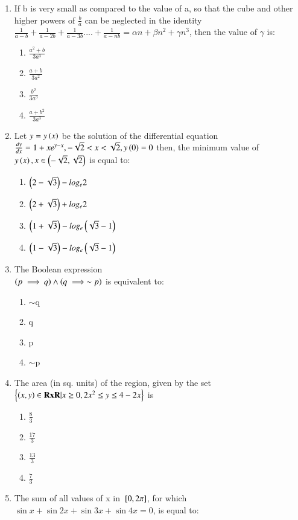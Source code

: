 \documentclass[journal,12pt,onecolumn]{IEEEtran}
\theoremstyle{remark}
\begin{document}
\begin{enumerate}
\begin{enumerate}
\end{enumerate}
\item If b is very small as compared to the value of a, so that the cube and other higher powers of $\frac{b}{a}$ can be neglected in the identity\\
$\frac{1}{a-b}+\frac{1}{a-2b}+\frac{1}{a-3b}....+\frac{1}{a-nb}=\alpha n+\beta n^2+\gamma n^3$, then the value of $\gamma$ is:
\begin{enumerate}
    \item $\frac{a^2+b}{3a^3}$
    \item $\frac{a+b}{3a^2}$
    \item $\frac{b^2}{3a^3}$
    \item $\frac{a+b^2}{3a^3}$
\end{enumerate}
\item Let $y=y\left(x\right)$ be the solution of the differential equation $\frac{dy}{dx}=1+xe^{y-x}, -\sqrt{2}<x<\sqrt{2},y\left(0\right)=0$ then, the minimum value of $y\left(x\right), x \in \left(-\sqrt{2}, \sqrt{2}\right)$ is equal to:
\begin{enumerate}
    \item $\left(2-\sqrt{3}\right)-log_e2$
    \item $\left(2+\sqrt{3}\right)+log_e2$
    \item $\left(1+\sqrt{3}\right)-log_e\left(\sqrt{3}-1\right)$
    \item $\left(1-\sqrt{3}\right)-log_e\left(\sqrt{3}-1\right)$
\end{enumerate}
\item The Boolean expression\\
$\left(p \implies q\right) \land \left(q \implies \sim p\right) $ is equivalent to:
\begin{enumerate}
    \item $\sim$q
    \item q
    \item p
    \item $\sim$p
\end{enumerate}
\item The area (in sq. units) of the region, given by the set $\left\{\left(x,y\right) \in \mathbf{RxR}|x\geq0,2x^2\leq y\leq 4-2x\right\}$ is
\begin{enumerate}
    \item $\frac{8}{3}$
    \item $\frac{17}{3}$
    \item $\frac{13}{3}$
    \item $\frac{7}{3}$
\end{enumerate}
\item The sum of all values of x in ${}\left[0,2\pi\right]$, for which $\sin x+\sin2x+\sin3x+\sin4x=0$, is equal to:

\end{enumerate}
\end{document}
